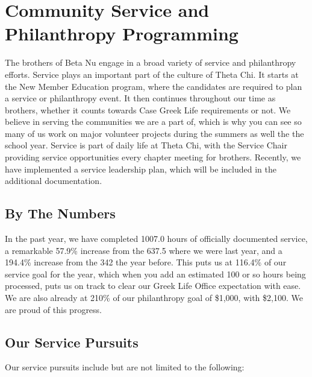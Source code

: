 \chapter{Community Service and Philanthropy Programming}

  The brothers of Beta Nu engage in a broad variety of service and philanthropy efforts. Service plays an important part of the culture of Theta Chi. It starts at the New Member Education program, where the candidates are required to plan a service or philanthropy event. It then continues throughout our time as brothers, whether it counts towards Case Greek Life requirements or not. We believe in serving the communities we are a part of, which is why you can see so many of us work on major volunteer projects during the summers as well the the school year. Service is part of daily life at Theta Chi, with the Service Chair providing service opportunities every chapter meeting for brothers. Recently, we have implemented a service leadership plan, which will be included in the additional documentation.
  
  \section*{By The Numbers}
  In the past year, we have completed 1007.0 hours of officially documented service, a remarkable  57.9\% increase from the 637.5 where we were last year, and a 194.4\% increase from the 342 the year before. This puts us at 116.4\% of our service goal for the year, which when you add an estimated 100 or so hours being processed, puts us on track to clear our Greek Life Office expectation with ease. We are also already at 210\% of our philanthropy goal of \$1,000, with \$2,100. We are proud of this progress.
  
  \section*{Our Service Pursuits}
   Our service pursuits include but are not limited to the following:
      
